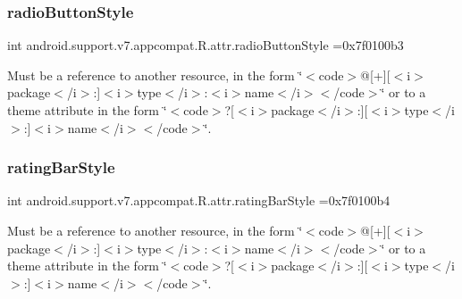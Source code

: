 \subsubsection{\texorpdfstring{radio\+Button\+Style}{radioButtonStyle}}
{\footnotesize\ttfamily int android.\+support.\+v7.\+appcompat.\+R.\+attr.\+radio\+Button\+Style =0x7f0100b3\hspace{0.3cm}{\ttfamily [static]}}

Must be a reference to another resource, in the form \char`\"{}$<$code$>$@\mbox{[}+\mbox{]}\mbox{[}$<$i$>$package$<$/i$>$\+:\mbox{]}$<$i$>$type$<$/i$>$\+:$<$i$>$name$<$/i$>$$<$/code$>$\char`\"{} or to a theme attribute in the form \char`\"{}$<$code$>$?\mbox{[}$<$i$>$package$<$/i$>$\+:\mbox{]}\mbox{[}$<$i$>$type$<$/i$>$\+:\mbox{]}$<$i$>$name$<$/i$>$$<$/code$>$\char`\"{}. \mbox{\label{classandroid_1_1support_1_1v7_1_1appcompat_1_1R_1_1attr_ad8092b6dfc3e1e74cfb135768ce06f81}} 
\subsubsection{\texorpdfstring{rating\+Bar\+Style}{ratingBarStyle}}
{\footnotesize\ttfamily int android.\+support.\+v7.\+appcompat.\+R.\+attr.\+rating\+Bar\+Style =0x7f0100b4\hspace{0.3cm}{\ttfamily [static]}}

Must be a reference to another resource, in the form \char`\"{}$<$code$>$@\mbox{[}+\mbox{]}\mbox{[}$<$i$>$package$<$/i$>$\+:\mbox{]}$<$i$>$type$<$/i$>$\+:$<$i$>$name$<$/i$>$$<$/code$>$\char`\"{} or to a theme attribute in the form \char`\"{}$<$code$>$?\mbox{[}$<$i$>$package$<$/i$>$\+:\mbox{]}\mbox{[}$<$i$>$type$<$/i$>$\+:\mbox{]}$<$i$>$name$<$/i$>$$<$/code$>$\char`\"{}. \mbox{\label{classandroid_1_1support_1_1v7_1_1appcompat_1_1R_1_1attr_a3ca56be9fcffd4b6eca62a54767c55bf}} 
